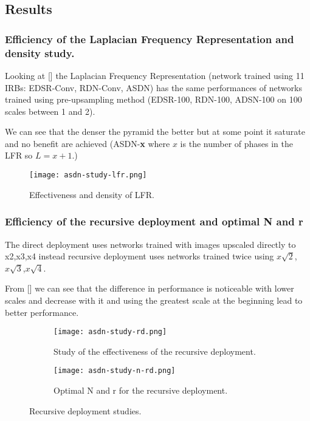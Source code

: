 \subsection{Results}

\subsubsection{Efficiency of the Laplacian Frequency Representation and density study.}
Looking at [] the Laplacian Frequency Representation (network trained using 11 IRBs: EDSR-Conv, RDN-Conv, ASDN) has the same performances of networks trained using pre-upsampling method (EDSR-100, RDN-100, ADSN-100 on 100 scales between 1 and 2).

We can see that the denser the pyramid the better but at some point it saturate and no benefit are achieved (ASDN-\textbf{x} where $x$ is the number of phases in the LFR so $L=x+1$.)

\begin{figure}[H]
    \centering
    \texttt{[image: asdn-study-lfr.png]}
    \caption{Effectiveness and density of LFR.}\label{asdn:lfrstudies}
\end{figure}

\subsubsection{Efficiency of the recursive deployment and optimal N and r}
The direct deployment uses networks trained with images upscaled directly to x2,x3,x4 instead recursive deployment uses networks trained twice using $x\sqrt{2}$, $x\sqrt{3}$,$x\sqrt{4}$.

From [] we can see that the difference in performance is noticeable with lower scales and decrease  with it and using the greatest scale at the beginning lead to better performance.

\begin{figure}[H]
    \begin{subfigure}{\textwidth}
        \centering
        \texttt{[image: asdn-study-rd.png]}
        \caption{Study of the effectiveness of the recursive deployment.}        
    \end{subfigure}
    \begin{subfigure}{\textwidth}
        \centering
        \texttt{[image: asdn-study-n-rd.png]}
        \caption{Optimal N and r for the recursive deployment.}
    \end{subfigure}
    \caption{Recursive deployment studies.}\label{asdn:rds}
\end{figure}


